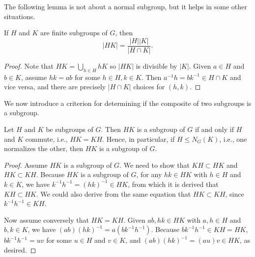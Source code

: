 The following lemma is not about a normal subgroup, but it helps in some other situations.
\begin{lem}
    If $H$ and $K$ are finite subgroups of $G$, then
    \begin{equation*}
        |HK|=\frac{|H||K|}{|H\cap K|}.
    \end{equation*}
\end{lem}
\begin{proof}
    Note that $HK=\bigcup_{h\in H}{hK}$ so $|HK|$ is divisible by $|K|$.
    Given $a\in H$ and $b\in K$, assume $hk=ab$ for some $h\in H, k\in K$.
    Then $a^{-1}h=bk^{-1}\in H\cap K$ and vice versa, and there are precisely $|H\cap K|$ choices for $(h, k)$.
\end{proof}

We now introduce a criterion for determining if the composite of two subgroups is a subgroup.
\begin{prop}
    Let $H$ and $K$ be subgroups of $G$.
    Then $HK$ is a subgroup of $G$ if and only if $H$ and $K$ commute, i.e., $HK=KH$.
    Hence, in particular, if $H\leq N_G(K)$, i.e., one normalizes the other, then $HK$ is a subgroup of $G$.
\end{prop}
\begin{proof}
    Assume $HK$ is a subgroup of $G$.
    We need to show that $KH\subset HK$ and $HK\subset KH$.
    Because $HK$ is a subgroup of $G$, for any $hk\in HK$ with $h\in H$ and $k\in K$, we have $k^{-1}h^{-1}=(hk)^{-1}\in HK$, from which it is derived that $KH\subset HK$.
    We could also derive from the same equation that $HK\subset KH$, since $k^{-1}h^{-1}\in KH$.

    Now assume conversely that $HK=KH$.
    Given $ab, hk\in HK$ with $a, h\in H$ and $b, k\in K$, we have $(ab)(hk)^{-1}=a(bk^{-1}h^{-1})$.
    Because $bk^{-1}h^{-1}\in KH=HK$, $bk^{-1}h^{-1}=uv$ for some $u\in H$ and $v\in K$, and $(ab)(hk)^{-1}=(au)v\in HK$, as desired.
\end{proof}